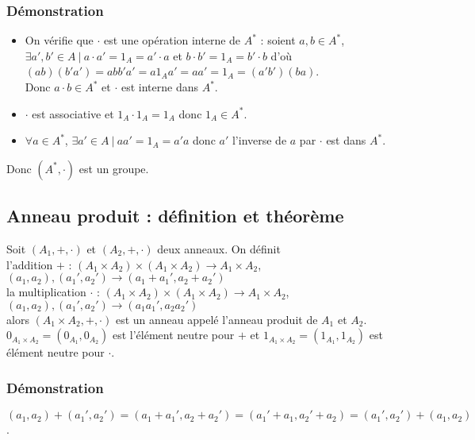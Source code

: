 \documentclass[a4paper,10pt]{book} %
\newcommand{\tq}{~|~}
\begin{document}
\subsubsection{Démonstration}
\begin{itemize}[label=$\bullet$]
\item On vérifie que $\cdot$ est une opération interne de $A^*$ : soient $a,b\in A^*$, $\exists a',b'\in A \tq a\cdot a'=1_A=a'\cdot a$ et $b\cdot b'=1_A=b'\cdot b$ d'où
$(ab)(b'a')=abb'a'=a1_Aa'=aa'=1_A=(a'b')(ba)$.\\
Donc $a\cdot b\in A^*$ et $\cdot$ est interne dans $A^*$.\\

\item $\cdot$ est associative et $1_A\cdot 1_A=1_A$ donc $1_A\in A^*$.\\

\item $\forall a\in A^*$, $\exists a'\in A \tq aa'=1_A=a'a$ donc $a'$ l'inverse de $a$ par $\cdot$ est dans $A^*$.
\end{itemize}
Donc $(A^*,\cdot)$ est un groupe.\\

\newpage

\subsection{Anneau produit : définition et théorème}
Soit $(A_1,+,\cdot)$ et $(A_2,+,\cdot)$ deux anneaux. On définit \\
l'addition $+$ : $(A_1\times A_2)\times (A_1\times A_2)\rightarrow A_1\times A_2$,
			 $(a_1,a_2),(a_1',a_2')\rightarrow  (a_1+a_1',a_2+a_2')$\\
la multiplication $\cdot$ : $(A_1\times A_2)\times (A_1\times A_2)\rightarrow A_1\times A_2$,
$(a_1,a_2),(a_1',a_2')\rightarrow  (a_1a_1',a_2a_2')$\\

alors $(A_1\times A_2,+,\cdot)$ est un anneau appelé l'anneau produit de $A_1$ et $A_2$.\\
$0_{A_1\times A_2}=(0_{A_1},0_{A_2})$ est l'élément neutre pour $+$ et 
$1_{A_1\times A_2}=(1_{A_1},1_{A_2})$ est élément neutre pour $\cdot$.

\subsubsection{Démonstration}\small
$(a_1,a_2)+(a_1',a_2')=(a_1+a_1',a_2+a_2')=(a_1'+a_1,a_2'+a_2)=(a_1',a_2')+(a_1,a_2)$.
\end{document}
